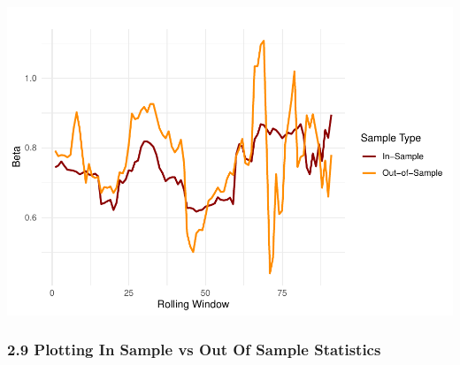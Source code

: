 \documentclass[
  12pt,
]{article}
\begin{document}
\includegraphics{NDXNES005_A2_RMD_files/figure-latex/unnamed-chunk-9-2.pdf}

\subsubsection{2.9 Plotting In Sample vs Out Of Sample
Statistics}\label{plotting-in-sample-vs-out-of-sample-statistics}
\end{document}
